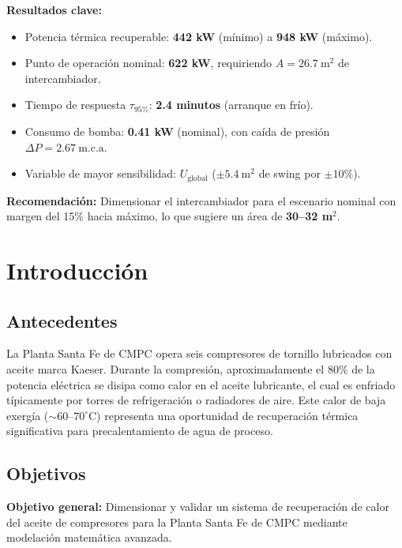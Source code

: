 \documentclass[11pt,a4paper]{report}
\begin{document}
\textbf{Resultados clave:}
\begin{itemize}
  \item Potencia térmica recuperable: \textbf{442 kW} (mínimo) a \textbf{948 kW} (máximo).
  \item Punto de operación nominal: \textbf{622 kW}, requiriendo $A = 26.7\ \text{m}^2$ de intercambiador.
  \item Tiempo de respuesta $\tau_{95\%}$: \textbf{2.4 minutos} (arranque en frío).
  \item Consumo de bomba: \textbf{0.41 kW} (nominal), con caída de presión $\Delta P = 2.67\ \text{m.c.a.}$
  \item Variable de mayor sensibilidad: \textbf{$U_{\text{global}}$} ($\pm 5.4\ \text{m}^2$ de swing por $\pm 10\%$).
\end{itemize}

\textbf{Recomendación:} Dimensionar el intercambiador para el escenario nominal con margen del 15\% hacia máximo, lo que sugiere un área de \textbf{30--32 m}$^2$.

\tableofcontents

\chapter{Introducción}

\section{Antecedentes}

La Planta Santa Fe de CMPC opera seis compresores de tornillo lubricados con aceite marca Kaeser. Durante la compresión, aproximadamente el 80\% de la potencia eléctrica se disipa como calor en el aceite lubricante, el cual es enfriado típicamente por torres de refrigeración o radiadores de aire. Este calor de baja exergía ($\sim 60$--$70^\circ\text{C}$) representa una oportunidad de recuperación térmica significativa para precalentamiento de agua de proceso.

\section{Objetivos}

\textbf{Objetivo general:} Dimensionar y validar un sistema de recuperación de calor del aceite de compresores para la Planta Santa Fe de CMPC mediante modelación matemática avanzada.
\end{document}
